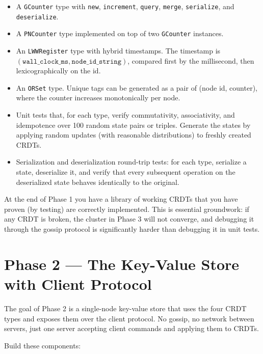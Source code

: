 \documentclass[11pt,a4paper]{article}
\begin{document}
\begin{itemize}
\item A \texttt{GCounter} type with \texttt{new}, \texttt{increment}, \texttt{query}, \texttt{merge}, \texttt{serialize}, and \texttt{deserialize}.

\item A \texttt{PNCounter} type implemented on top of two \texttt{GCounter} instances.

\item An \texttt{LWWRegister} type with hybrid timestamps. The timestamp is $(\texttt{wall\_clock\_ms}, \texttt{node\_id\_string})$, compared first by the millisecond, then lexicographically on the id.

\item An \texttt{ORSet} type. Unique tags can be generated as a pair of (node id, counter), where the counter increases monotonically per node.

\item Unit tests that, for each type, verify commutativity, associativity, and idempotence over 100 random state pairs or triples. Generate the states by applying random updates (with reasonable distributions) to freshly created CRDTs.

\item Serialization and deserialization round-trip tests: for each type, serialize a state, deserialize it, and verify that every subsequent operation on the deserialized state behaves identically to the original.
\end{itemize}

At the end of Phase 1 you have a library of working CRDTs that you have proven (by testing) are correctly implemented. This is essential groundwork: if any CRDT is broken, the cluster in Phase 3 will not converge, and debugging it through the gossip protocol is significantly harder than debugging it in unit tests.

\section{Phase 2 --- The Key-Value Store with Client Protocol}

The goal of Phase 2 is a single-node key-value store that uses the four CRDT types and exposes them over the client protocol. No gossip, no network between servers, just one server accepting client commands and applying them to CRDTs.

Build these components:
\end{document}
